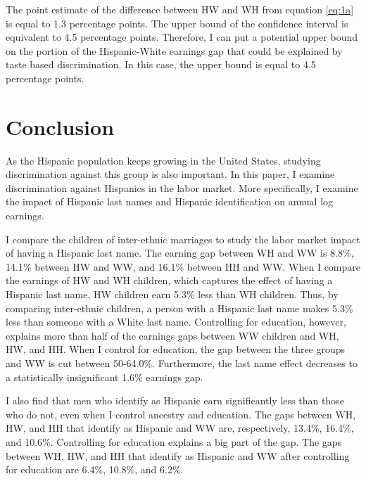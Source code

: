 \documentclass{wptemp}
\begin{document}
The point estimate of the difference between HW and WH from equation \ref{eq:1a} is equal to 1.3 percentage points. The upper bound of the confidence interval is equivalent to 4.5 percentage points. Therefore, I can put a potential upper bound on the portion of the Hispanic-White earnings gap that could be explained by taste based discrimination. In this case, the upper bound is equal to 4.5 percentage points.

\section{Conclusion}\label{sec:con}

As the Hispanic population keeps growing in the United States, studying discrimination against this group is also important. In this paper, I examine discrimination against Hispanics in the labor market. More specifically, I examine the impact of Hispanic last names and Hispanic identification on annual log earnings. 

I compare the children of inter-ethnic marriages to study the labor market impact of having a Hispanic last name. The earning gap between WH and WW is 8.8\%, 14.1\% between HW and WW, and 16.1\% between HH and WW. When I compare the earnings of HW and WH children, which captures the effect of having a Hispanic last name, HW children earn 5.3\% less than WH children. Thus, by comparing inter-ethnic children, a person with a Hispanic last name makes 5.3\% less than someone with a White last name. Controlling for education, however, explains more than half of the earnings gaps between WW children and WH, HW, and HH. When I control for education, the gap between the three groups and WW is cut between 50-64.0\%. Furthermore, the last name effect decreases to a statistically insignificant 1.6\% earnings gap.

I also find that men who identify as Hispanic earn significantly less than those who do not, even when I control ancestry and education. The gaps between WH, HW, and HH that identify as Hispanic and WW are, respectively, 13.4\%, 16.4\%, and 10.6\%. Controlling for education explains a big part of the gap. The gaps between WH, HW, and HH that identify as Hispanic and WW after controlling for education are 6.4\%, 10.8\%, and 6.2\%. 
\end{document}
